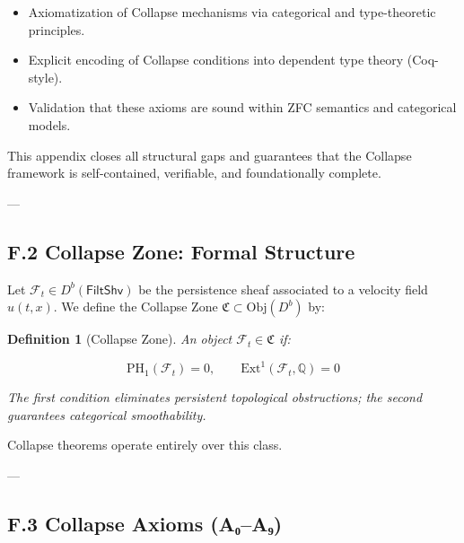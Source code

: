 \documentclass[11pt]{article}
\newtheorem{definition}[theorem]{Definition}
\begin{document}
\begin{itemize}
  \item Axiomatization of Collapse mechanisms via categorical and type-theoretic principles.
  \item Explicit encoding of Collapse conditions into dependent type theory (Coq-style).
  \item Validation that these axioms are sound within ZFC semantics and categorical models.
\end{itemize}

This appendix closes all structural gaps and guarantees that the Collapse framework is self-contained, verifiable, and foundationally complete.

---

\subsection*{F.2 Collapse Zone: Formal Structure}

Let \( \mathcal{F}_t \in D^b(\mathsf{FiltShv}) \) be the persistence sheaf associated to a velocity field \( u(t,x) \).  
We define the Collapse Zone \( \mathfrak{C} \subset \mathrm{Obj}(D^b) \) by:

\begin{definition}[Collapse Zone]
An object \( \mathcal{F}_t \in \mathfrak{C} \) if:

\[
\mathrm{PH}_1(\mathcal{F}_t) = 0, \qquad \mathrm{Ext}^1(\mathcal{F}_t, \mathbb{Q}) = 0
\]

The first condition eliminates persistent topological obstructions;  
the second guarantees categorical smoothability.
\end{definition}

Collapse theorems operate entirely over this class.

---

\subsection*{F.3 Collapse Axioms (A₀–A₉)}
\end{document}
